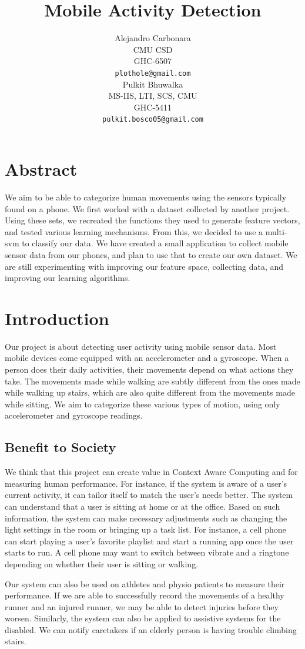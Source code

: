 \documentclass{article} %
\title{Mobile Activity Detection}
\author{
Alejandro Carbonara\\
CMU CSD\\
GHC-6507 \\
\texttt{plothole@gmail.com}\\
\AND
Pulkit Bhuwalka \\
MS-IIS, LTI, SCS, CMU \\
GHC-5411 \\
\texttt{pulkit.bosco05@gmail.com} \\
}
\begin{document}
\maketitle

\section{Abstract}
We aim to be able to categorize human movements using the sensors typically found on a phone. We first worked with a dataset collected by another project. Using these sets, we recreated the functions they used to generate feature vectors, and tested various learning mechanisms. From this, we decided to use a multi-svm to classify our data. We have created a small application to collect mobile sensor data from our phones, and plan to use that to create our own dataset. We are still experimenting with improving our feature space, collecting data, and improving our learning algorithms.
\section{Introduction}
Our project is about detecting user activity using mobile sensor data. Most mobile devices come equipped with an accelerometer and a gyroscope. When a person does their daily activities, their movements depend on what actions they take. The movements made while walking are subtly different from the ones made while walking up stairs, which are also quite different from the movements made while sitting. We aim to categorize these various types of motion, using only accelerometer and gyroscope readings.
\subsection{Benefit to Society}
We think that this project can create value in Context Aware Computing and for measuring human performance. For instance, if the system is aware of a user's current activity, it can tailor itself to match the user's needs better. The system can understand that a user is sitting at home or at the office. Based on such information, the system can make necessary adjustments such as changing the light settings in the room or bringing up a task list. For instance, a cell phone can start playing a user's favorite playlist and start a running app once the user starts to run. A cell phone may want to switch between vibrate and a ringtone depending on whether their user is sitting or walking.

Our system can also be used on athletes and physio patients to measure their performance. If we are able to successfully record the movements of a healthy runner and an injured runner, we may be able to detect injuries before they worsen. Similarly, the system can also be applied to assistive systems for the disabled. We can notify caretakers if an elderly person is having trouble climbing stairs.
\end{document}
